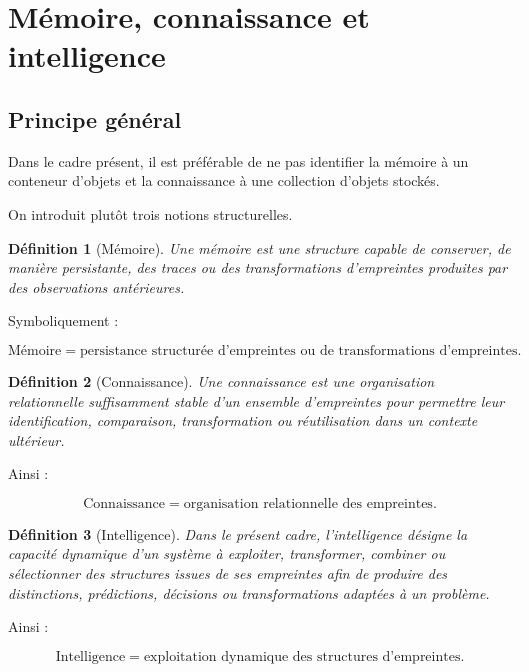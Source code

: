 \documentclass[11pt,a4paper]{article}
\newtheorem{definition}{Définition}[section]
\begin{document}
\section{Mémoire, connaissance et intelligence}

\subsection{Principe général}

Dans le cadre présent, il est préférable de ne pas identifier la mémoire à un
conteneur d'objets et la connaissance à une collection d'objets stockés.

On introduit plutôt trois notions structurelles.

\begin{definition}[Mémoire]
Une mémoire est une structure capable de conserver, de manière persistante,
des traces ou des transformations d'empreintes produites par des observations
antérieures.
\end{definition}

Symboliquement :

\[
\boxed{
\text{Mémoire}
=
\text{persistance structurée d'empreintes ou de transformations
d'empreintes}.
}
\]

\begin{definition}[Connaissance]
Une connaissance est une organisation relationnelle suffisamment stable
d'un ensemble d'empreintes pour permettre leur identification, comparaison,
transformation ou réutilisation dans un contexte ultérieur.
\end{definition}

Ainsi :

\[
\boxed{
\text{Connaissance}
=
\text{organisation relationnelle des empreintes}.
}
\]

\begin{definition}[Intelligence]
Dans le présent cadre, l'intelligence désigne la capacité dynamique d'un
système à exploiter, transformer, combiner ou sélectionner des structures
issues de ses empreintes afin de produire des distinctions, prédictions,
décisions ou transformations adaptées à un problème.
\end{definition}

Ainsi :

\[
\boxed{
\text{Intelligence}
=
\text{exploitation dynamique des structures d'empreintes}.
}
\]
\end{document}

